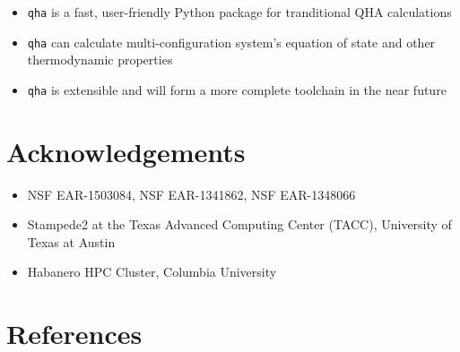 \documentclass[13pt,aspectratio=169]{beamer}
\begin{document}
\begin{frame}{\secname}
	\begin{itemize}[<+(1)->]
		\setlength\itemsep{1em}
		\item \texttt{qha} is a fast, user-friendly Python package for tranditional QHA calculations
		\item \texttt{qha} can calculate multi-configuration system's equation of state and other thermodynamic properties
		\item \texttt{qha} is extensible and will form a more complete toolchain in the near future
	\end{itemize}
\end{frame}

\section{Acknowledge\-ments}
\begin{frame}{\secname}
	\begin{itemize}
		\item NSF EAR-1503084, NSF EAR-1341862, NSF EAR-1348066
		\item Stampede2 at the Texas Advanced Computing Center (TACC), University of Texas at Austin
		\item Habanero HPC Cluster, Columbia University
	\end{itemize}
\end{frame}

\section{References}
\begin{frame}[allowframebreaks]{\secname}
	\printbibliography
\end{frame}
\end{document}
